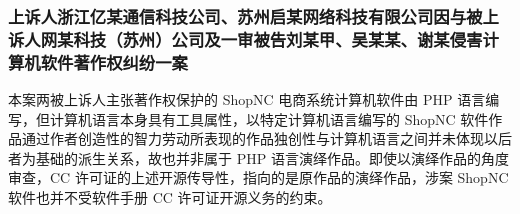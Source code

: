 \documentclass[xcolor=table,dvipsnames,svgnames,aspectratio=169]{ctexbeamer}
\begin{document}
\begin{frame}
  \frametitle{上诉人浙江亿某通信科技公司、苏州启某网络科技有限公司因与被上诉人网某科技（苏州）公司及一审被告刘某甲、吴某某、谢某侵害计算机软件著作权纠纷一案}

  本案两被上诉人主张著作权保护的 ShopNC 电商系统计算机软件由 PHP 语言编写，但计算机语言本身具有工具属性，以特定计算机语言编写的 ShopNC 软件作品通过作者创造性的智力劳动所表现的作品独创性与计算机语言之间并未体现以后者为基础的派生关系，故也并非属于 PHP 语言演绎作品。即使以演绎作品的角度审查，CC 许可证的上述开源传导性，指向的是原作品的演绎作品，涉案 ShopNC 软件也并不受软件手册 CC 许可证开源义务的约束。
  
\end{frame}

\makebottom
\end{document}
